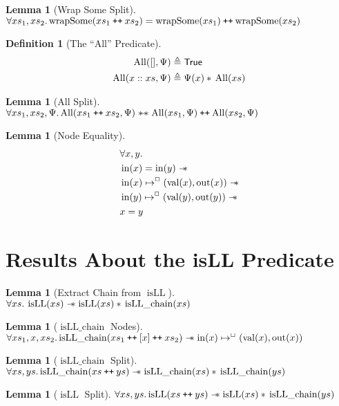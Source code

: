 \documentclass[a4paper, 10pt]{report}
\theoremstyle{definition}
\newtheorem{lemma}[theorem]{Lemma}
\newtheorem{definition}{Definition}[section]
\newcommand{\isLLchain}{\operatorname{isLL\_chain}}
\newcommand{\isLL}{\operatorname{isLL}}
\newcommand{\AllP}{\operatorname{All}}
\newcommand{\wrapsome}{\operatorname{wrapSome}}
\newcommand{\nIn}[1]{\operatorname{in}(#1)}
\newcommand{\nVal}[1]{\operatorname{val}(#1)}
\newcommand{\nOut}[1]{\operatorname{out}(#1)}
\newcommand\catenate{\mathbin{\text{\ttfamily\upshape ++}}}
\newcommand{\isNode}[1]{\nIn{#1} \mapsto^{\persistently} (\nVal{#1}, \nOut{#1})}
\begin{document}
\begin{lemma}[Wrap Some Split]\label{lemma:wrap-some-split}
  $\All xs_1, xs_2.\\
  \wrapsome(xs_1 \catenate xs_2) = \wrapsome(xs_1) \catenate \wrapsome(xs_2)$
\end{lemma}


\begin{definition}[The ``All'' Predicate]\label{COMMON:Def:All}
  \begin{align*}
    \AllP([], \Psi) &\eqdef \TRUE\\
    \AllP(x :: xs, \Psi) &\eqdef \Psi(x) \star{} \AllP(xs)
  \end{align*}
\end{definition}

\begin{lemma}[All Split]\label{lemma:all-split}
  $\All xs_1, xs_2, \Psi.\\
  \AllP(xs_1 \catenate xs_2, \Psi) \wandIff \AllP(xs_1, \Psi) \catenate \AllP(xs_2, \Psi)$
\end{lemma}


\begin{lemma}[Node Equality]\label{lemma:nIn-equal}
  \begin{align*}
    &\All x, y.\\
    &\nIn{x} = \nIn{y} \wand\\
    &\isNode{x} \wand\\
    &\isNode{y} \wand\\
    &x = y
  \end{align*}
\end{lemma}

\section{Results About the isLL Predicate}
\label{appendix:common:section:isll}

\begin{lemma}[Extract Chain from $\isLL$]\label{lemma:isLL-and-chain}
  $\All xs. \isLL(xs) \wand \isLL(xs) \star{} \isLLchain(xs)$
\end{lemma}

\begin{lemma}[$\isLLchain$ Nodes]\label{lemma:isLL-chain-nodes}
  $\All xs_1, x, xs_2.\\
   \isLLchain(xs_1 \catenate [x] \catenate xs_2) \wand \isNode{x}$
\end{lemma}

\begin{lemma}[$\isLLchain$ Split]\label{lemma:isLL-chain-split}
  $\All xs, ys.\\
   \isLLchain(xs \catenate ys) \wand \isLLchain(xs) \star{} \isLLchain(ys)$
\end{lemma}

\begin{lemma}[$\isLL$ Split]\label{lemma:isLL-split}
  $\All xs, ys.\\
   \isLL(xs \catenate ys) \wand \isLL(xs) \star{} \isLLchain(ys)$
\end{lemma}
\end{document}
